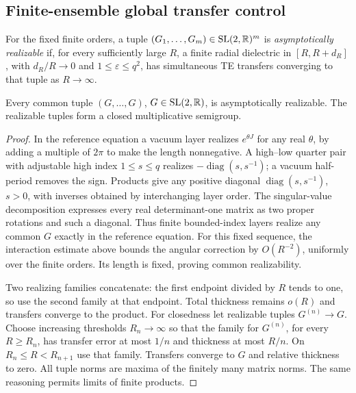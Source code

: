 \subsection{Finite-ensemble global transfer control}

\begin{definition}\label{cc:realizable}
For the fixed finite orders, a tuple
$(G_1,\ldots,G_m)\in{\rm SL}(2,\mathbb R)^m$ is
\emph{asymptotically realizable} if, for every sufficiently large
$R$, a finite radial dielectric in $[R,R+d_R]$, with
$d_R/R\to0$ and $1\leq\varepsilon\leq q^2$, has simultaneous
TE transfers converging to that tuple as $R\to\infty$.
\end{definition}

\begin{lemma}
\label{cc:common-and-closure}
Every common tuple $(G,\ldots,G)$, $G\in{\rm SL}(2,\mathbb R)$,
is asymptotically realizable. The realizable tuples form a closed
multiplicative semigroup.
\end{lemma}
\begin{proof}
In the reference equation a vacuum layer realizes $e^{\theta J}$
for any real $\theta$, by adding a multiple of $2\pi$ to make the
length nonnegative. A high--low quarter pair with adjustable high
index $1\leq s\leq q$ realizes
$-\operatorname{diag}(s,s^{-1})$; a vacuum half-period removes
the sign. Products give any positive diagonal
$\operatorname{diag}(s,s^{-1})$, $s>0$, with inverses obtained
by interchanging layer order. The singular-value decomposition
expresses every real determinant-one matrix as two proper
rotations and such a diagonal. Thus finite bounded-index layers
realize any common $G$ exactly in the reference equation.
For this fixed sequence, the interaction estimate above bounds
the angular correction by $O(R^{-2})$, uniformly over the finite
orders. Its length is fixed, proving common realizability.

Two realizing families concatenate: the first endpoint divided
by $R$ tends to one, so use the second family at that endpoint.
Total thickness remains $o(R)$ and transfers converge to the
product. For closedness let realizable tuples $G^{(n)}\to G$.
Choose increasing thresholds $R_n\to\infty$ so that the family
for $G^{(n)}$, for every $R\geq R_n$, has transfer error at most
$1/n$ and thickness at most $R/n$. On $R_n\leq R<R_{n+1}$
use that family. Transfers converge to $G$ and relative thickness
to zero. All tuple norms are maxima of the finitely many matrix
norms. The same reasoning permits limits of finite products.
\end{proof}

